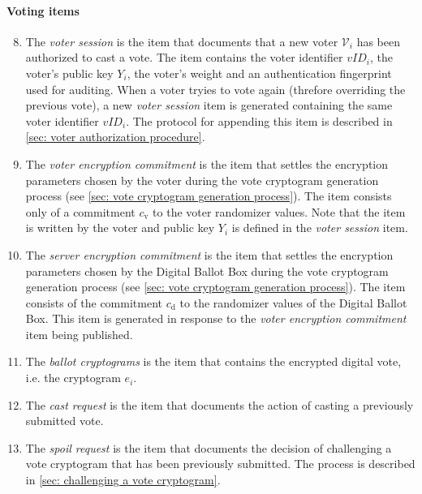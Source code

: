 \paragraph{Voting items}
\begin{enumerate}
    \setcounter{enumi}{7}
    \item The \textit{voter session} is the item that documents that a new voter $\mathcal{V}_i$ has been authorized to cast a vote. The item contains the voter identifier $vID_i$, the voter's public key $Y_i$, the voter's weight and an authentication fingerprint used for auditing. When a voter tryies to vote again (threfore overriding the previous vote), a new \textit{voter session} item is generated containing the same voter identifier $vID_i$. The protocol for appending this item is described in \cref{sec: voter authorization procedure}.

    \item The \textit{voter encryption commitment} is the item that settles the encryption parameters chosen by the voter during the vote cryptogram generation process (see \cref{sec: vote cryptogram generation process}). The item consists only of a commitment $c_\mathrm{v}$ to the voter randomizer values. Note that the item is written by the voter and public key $Y_i$ is defined in the \textit{voter session} item.
    
    \item The \textit{server encryption commitment} is the item that settles the encryption parameters chosen by the Digital Ballot Box during the vote cryptogram generation process (see \cref{sec: vote cryptogram generation process}). The item consists of the commitment $c_\mathrm{d}$ to the randomizer values of the Digital Ballot Box. This item is generated in response to the \textit{voter encryption commitment} item being published.
    
    \item The \textit{ballot cryptograms} is the item that contains the encrypted digital vote, i.e. the cryptogram $e_i$.
    
    \item The \textit{cast request} is the item that documents the action of casting a previously submitted vote.
    
    \item The \textit{spoil request} is the item that documents the decision of challenging a vote cryptogram that has been previously submitted. The process is described in \cref{sec: challenging a vote cryptogram}.
\end{enumerate}

